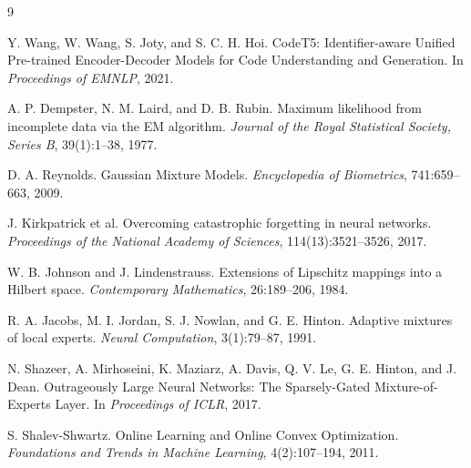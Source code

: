 \documentclass[12pt,a4paper]{article}
\begin{document}

\begin{thebibliography}{9}

Y. Wang, W. Wang, S. Joty, and S. C. H. Hoi.
\newblock CodeT5: Identifier-aware Unified Pre-trained Encoder-Decoder Models for Code Understanding and Generation.
\newblock In \emph{Proceedings of EMNLP}, 2021.

A. P. Dempster, N. M. Laird, and D. B. Rubin.
\newblock Maximum likelihood from incomplete data via the EM algorithm.
\newblock \emph{Journal of the Royal Statistical Society, Series B}, 39(1):1--38, 1977.

D. A. Reynolds.
\newblock Gaussian Mixture Models.
\newblock \emph{Encyclopedia of Biometrics}, 741:659--663, 2009.

J. Kirkpatrick et al.
\newblock Overcoming catastrophic forgetting in neural networks.
\newblock \emph{Proceedings of the National Academy of Sciences}, 114(13):3521--3526, 2017.

W. B. Johnson and J. Lindenstrauss.
\newblock Extensions of Lipschitz mappings into a Hilbert space.
\newblock \emph{Contemporary Mathematics}, 26:189--206, 1984.

R. A. Jacobs, M. I. Jordan, S. J. Nowlan, and G. E. Hinton.
\newblock Adaptive mixtures of local experts.
\newblock \emph{Neural Computation}, 3(1):79--87, 1991.

N. Shazeer, A. Mirhoseini, K. Maziarz, A. Davis, Q. V. Le, G. E. Hinton, and J. Dean.
\newblock Outrageously Large Neural Networks: The Sparsely-Gated Mixture-of-Experts Layer.
\newblock In \emph{Proceedings of ICLR}, 2017.

S. Shalev-Shwartz.
\newblock Online Learning and Online Convex Optimization.
\newblock \emph{Foundations and Trends in Machine Learning}, 4(2):107--194, 2011.

\end{thebibliography}
\end{document}
